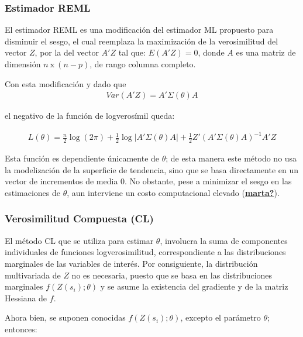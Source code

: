 \documentclass[
]{book}
\begin{document}
\hypertarget{estimador-reml}{%
\subsubsection*{Estimador REML}\label{estimador-reml}}

El estimador REML es una modificación del estimador ML propuesto para disminuir el sesgo, el cual reemplaza la maximización de la verosimilitud del vector \(Z\), por la del vector \(A'Z\) tal que: \(E(A'Z)=0\), donde \(A\) es una matriz de dimensión \(n\ \text{x}\ (n-p)\), de rango columna completo.

Con esta modificación y dado que \begin{align}
  Var(A'Z)=A'\Sigma(\theta)A  
\end{align}

el negativo de la función de logverosímil queda:

\begin{align}
   L(\theta)=\frac{n}{2}\log(2\pi)+\frac{1}{2} \log|A'\Sigma(\theta) A|+\frac{1}{2}Z'(A'\Sigma(\theta) A)^{-1} A'Z 
\end{align}

Esta función es dependiente únicamente de \(\theta\); de esta manera este método no usa la modelización de la superficie de tendencia, sino que se basa directamente en un vector de incrementos de media 0. No obstante, pese a minimizar el sesgo en las estimaciones de \(\theta\), aun interviene un costo computacional elevado (\protect\hyperlink{ref-marta}{\textbf{marta?}}).

\hypertarget{verosimilitud-compuesta-cl}{%
\subsubsection*{Verosimilitud Compuesta (CL)}\label{verosimilitud-compuesta-cl}}

El método CL que se utiliza para estimar \(\theta\), involucra la suma de componentes individuales de funciones logverosimilitud, correspondiente a las distribuciones marginales de las variables de interés. Por consiguiente, la distribución multivariada de \(Z\) no es necesaria, puesto que se basa en las distribuciones marginales \(f(Z(s_i);\theta)\) y se asume la existencia del gradiente y de la matriz Hessiana de \(f\).

Ahora bien, se suponen conocidas \(f(Z(s_i);\theta)\), excepto el parámetro \(\theta\); entonces:
\end{document}
